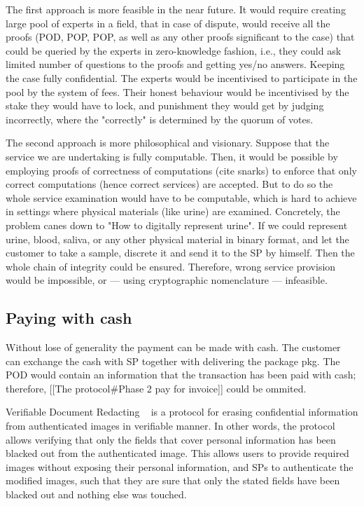 \documentclass{article}
\begin{document}
The first approach is more feasible in the near future. It would require creating large pool of experts in a field, that in case of dispute, would receive all the proofs (POD, POP, POP, as well as any other proofs significant to the case) that could be queried by the experts in zero-knowledge fashion, i.e., they could ask limited number of questions to the proofs and getting yes/no answers. Keeping the case fully confidential. The experts would be incentivised to participate in the pool by the system of fees. Their honest behaviour would be incentivised by the stake they would have to lock, and punishment they would get by judging incorrectly, where the "correctly" is determined by the quorum of votes.

The second approach is more philosophical and visionary. Suppose that the service we are undertaking is fully computable. Then, it would be possible by employing proofs of correctness of computations (cite snarks) to enforce that only correct computations (hence correct services) are accepted. But to do so the whole service examination would have to be computable, which is hard to achieve in settings where physical materials (like urine) are examined. Concretely, the problem canes down to "How to digitally represent urine". If we could represent urine, blood, saliva, or any other physical material in binary format, and let the customer to take a sample, discrete it and send it to the SP by himself. Then the whole chain of integrity could be ensured. Therefore, wrong service provision would be impossible, or — using cryptographic nomenclature — infeasible. 

\subsection{Paying with cash}
Without lose of generality the payment can be made with cash. 
The customer can exchange the cash with SP together with delivering the package pkg. The POD would contain an information that the transaction has been paid with cash; therefore, [[The protocol#Phase 2 pay for invoice]] could be ommited. 



Verifiable Document Redacting ~\cite{chabanne2017verifiable} is a protocol for erasing confidential information from authenticated images in verifiable manner. In other words, the protocol allows verifying that only the fields that cover personal information has been blacked out from the authenticated image. This allows users to provide required images without exposing their personal information, and SPs to authenticate the modified images, such that they are sure that only the stated fields have been blacked out and nothing else was touched. 
\end{document}
